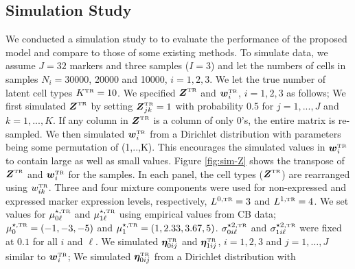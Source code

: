 \documentclass[12pt,]{article}
\def\bet{\bm{\eta}}
\newcommand{\true}{{\mbox{\tiny TR}}}
\newcommand{\bZ}{\mbox{\boldmath $Z$}}
\newcommand{\bw}{\mbox{\boldmath $w$}}
\begin{document}
\subsection{Simulation Study}\label{sec:CB-sim} %
We conducted a simulation study to  to evaluate the performance of the proposed
model and compare to those of some existing methods.
%
%
To simulate data, we assume $J=32$ markers and three samples ($I=3$) and let
the numbers of cells in samples $N_i=30000$, 20000 and 10000, $i=1, 2, 3$.  We
let the true number of latent cell types $K^\true=10$.  We specified
$\bZ^\true$ and $\bw^\true_i$, $i=1,2,3$ as follows;
%
We first simulated $\bZ^\true$ by setting $\bZ^\true_{jk}=1$ with probability
0.5 for $j=1,...,J$ and $k=1,...,K$. If any column in $\bZ^\true$ is a column
of only 0's, the entire matrix is re-sampled.
We then simulated $\bw^\true_i$ from a Dirichlet distribution with parameters
being some permutation of (1,..,K). This encourages the simulated values
in $\bw^\true_i$ to contain large as well as small values.
%
Figure \ref{fig:sim-Z} shows the transpose of $\bZ^\true$ and $\bw^\true_i$ for
the samples. In each panel, the cell types ($\bZ^\true$) are rearranged using
$w_{ik}^\true$.  Three and four mixture components were used for non-expressed
and expressed marker expression levels, respectively, $L^{0, \true}=3$ and
$L^{1, \true}=4$. We set values for $\mu^{\star, \true}_{0\ell}$ and
$\mu^{\star, \true}_{1\ell}$ using empirical values from CB data; $\mu^{\star,
\true}_{0} = (-1, -3, -5)$ and $\mu^{\star, \true}_{1} = (1, 2.33, 3.67, 5)$.
$\sigma^{\star 2, \true}_{0i\ell}$ and $\sigma^{\star 2,\true}_{1i\ell}$ were
fixed at $0.1$ for all $i$ and $\ell$.
%
We simulated $\bet_{0ij}^\true$ and $\bet_{1ij}^\true$, $i=1,2,3$ and $j=1,
\ldots, J$ similar to $\bw^\true_i$;
%
We simulated $\bet_{0ij}^\true$ from a Dirichlet distribution with
\end{document}

